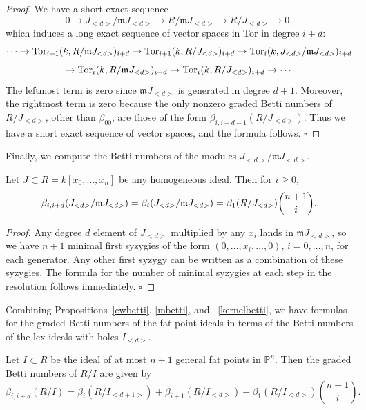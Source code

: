 \documentclass{article}
\begin{document}
\begin{proof}
We have a short exact sequence \[ 0 \longrightarrow J_{<d>}/\mathfrak m J_{<d>} \longrightarrow R/\mathfrak mJ_{<d>} \longrightarrow R/J_{<d>} \rightarrow 0, \] which induces a long exact sequence of vector spaces in Tor in degree $i+d$: \[ \cdots \rightarrow \hbox{Tor}_{i+1}(k,R/\mathfrak mJ_{<d>})_{i+d} \rightarrow \hbox{Tor}_{i+1}(k,R/J_{<d>})_{i+d} \rightarrow \hbox{Tor}_{i}(k,J_{<d>}/\mathfrak m J_{<d>})_{i+d}\] \[ \rightarrow \hbox{Tor}_{i}(k,R/\mathfrak mJ_{<d>})_{i+d} \rightarrow \hbox{Tor}_{i}(k,R/J_{<d>})_{i+d} \rightarrow \cdots \] The leftmost term is zero since $\mathfrak mJ_{<d>}$ is generated in degree $d+1$. Moreover, the rightmost term is zero because the only nonzero graded Betti numbers of $R/J_{<d>}$, other than $\beta_{00}$, are those of the form $\beta_{i,i+d-1}(R/J_{<d>})$. Thus we have a short exact sequence of vector spaces, and the formula follows. \hfill $\square$
\end{proof}

Finally, we compute the Betti numbers of the modules $J_{<d>}/\mathfrak m J_{<d>}$.

\begin{proposition}
\label{kernelbetti}
Let $J \subset R=k[x_0,\dots,x_n]$ be any homogeneous ideal. Then for $i \ge 0$, \[ \beta_{i,i+d}(J_{<d>}/\frak m J_{<d>})=\beta_{i}(J_{<d>}/\frak m J_{<d>}) = \beta_{1}(R/J_{<d>}) {n+1 \choose i}.\]
\end{proposition}

\begin{proof}
Any degree $d$ element of $J_{<d>}$ multiplied by any $x_i$ lands in $\mathfrak m J_{<d>}$, so we have $n+1$ minimal first syzygies of the form $(0,\dots,x_i,\dots,0)$, $i=0,\dots,n$, for each generator. Any other first syzygy can be written as a combination of these syzygies. The formula for the number of minimal syzygies at each step in the resolution follows immediately. \hfill $\square$
\end{proof}

Combining Propositions~\ref{cwbetti}, \ref{mbetti}, and ~\ref{kernelbetti}, we have formulas for the graded Betti numbers of the fat point ideals in terms of the Betti numbers of the lex ideals with holes $I_{<d>}$.

\begin{theorem}
\label{bettiformulas}
Let $I \subset R$ be the ideal of at most $n+1$ general fat points in $\mathbb P^n$. Then the graded Betti numbers of $R/I$ are given by \[ \beta_{i,i+d}(R/I) = \beta_i(R/I_{<d+1>})+\beta_{i+1}(R/I_{<d>}) - \beta_{1}(R/I_{<d>}) {n+1 \choose i}.\] 
\end{theorem}
\end{document}
